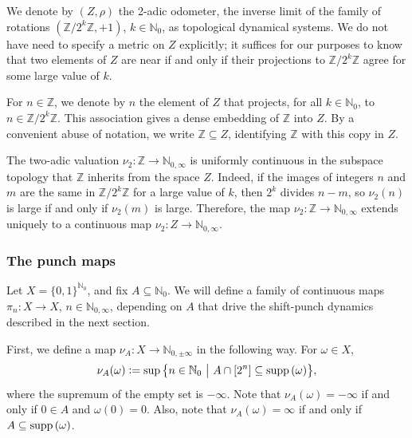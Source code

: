 \documentclass[letter,11pt]{article}
\theoremstyle{plain}
\theoremstyle{definition}
\theoremstyle{plain}
\theoremstyle{plain}
\numberwithin{equation}{section}
\newcommand{\supp}{{\normalfont\text{supp}}\,}
\newcommand{\N}{\mathbb{N}}
\newcommand{\Z}{\mathbb{Z}}
\newcommand{\defeq}{\vcentcolon=}
\newcommand{\odometer}{Z}
\newcommand{\orotation}{\rho}
\begin{document}
We denote by $(\odometer,\orotation)$ the 2-adic odometer, the inverse limit of the family of rotations $(\Z / 2^k \Z, \allowbreak +1)$, $k \in \N_0$, as topological dynamical systems.  We do not have need to specify a metric on $\odometer$ explicitly; it suffices for our purposes to know that two elements of $\odometer$ are near if and only if their projections to $\Z / 2^k \Z$ agree for some large value of $k$.

For $n \in \Z$, we denote by $n$ the element of $Z$ that projects, for all $k \in \N_0$, to $n \in \Z / 2^k \Z$. This association gives a dense embedding of $\Z$ into $\odometer$.  By a convenient abuse of notation, we write $\Z \subseteq \odometer$, identifying $\Z$ with this copy in $\odometer$.

The two-adic valuation $\nu_2: \Z \to \N_{0,\infty}$ is uniformly continuous in the subspace topology that $\Z$ inherits from the space $\odometer$.  Indeed, if the images of integers $n$ and $m$ are the same in $\Z / 2^k \Z$ for a large value of $k$, then $2^k$ divides $n-m$, so $\nu_2(n)$ is large if and only if $\nu_2(m)$ is large.  Therefore, the map $\nu_2: \Z \to \N_{0,\infty}$ extends uniquely to a continuous map $\nu_2: \odometer \to \N_{0,\infty}$.


\subsubsection{The punch maps}
\label{sec_punch_maps}

Let $X = \{0, 1\}^{\N_0}$, and fix $A \subseteq \N_0$.  We will define a family of continuous maps $\pi_n: X \to X$, $n \in \N_{0,\infty}$, depending on $A$ that drive the shift-punch dynamics described in the next section.


First, we define a map $\nu_A: X \to \N_{0,\pm\infty}$ in the following way.  For $\omega \in X$,
\begin{align}
    \label{eqn_def_of_M_set}
    \nu_A(\omega) \defeq \sup \big\{n \in \N_0 \ \big| \ A \cap [2^{n}] \subseteq \supp(\omega) \big\},
\end{align}
where the supremum of the empty set is $-\infty$.  Note that $\nu_A(\omega) = -\infty$ if and only if $0 \in A$ and $\omega(0) = 0$.  Also, note that $\nu_A(\omega) = \infty$ if and only if $A \subseteq \supp(\omega)$.
\end{document}
